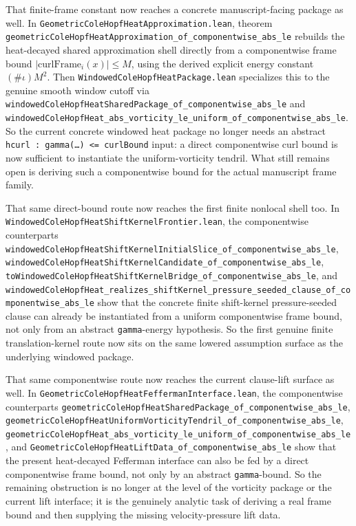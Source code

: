 \documentclass[11pt]{article}
\theoremstyle{remark}
\begin{document}
That finite-frame constant now reaches a concrete manuscript-facing package as
well.  In \texttt{GeometricColeHopfHeatApproximation.lean}, theorem
\texttt{geometricColeHopfHeatApproximation\_of\_componentwise\_abs\_le}
rebuilds the heat-decayed shared approximation shell directly from a
componentwise frame bound \(|\mathrm{curlFrame}_i(x)| \le M\), using the
derived explicit energy constant \((\#\iota) M^2\).  Then
\texttt{WindowedColeHopfHeatPackage.lean} specializes this to the genuine
smooth window cutoff via
\texttt{windowedColeHopfHeatSharedPackage\_of\_componentwise\_abs\_le} and
\texttt{windowedColeHopfHeat\_abs\_vorticity\_le\_uniform\_of\_componentwise\_abs\_le}.
So the current concrete windowed heat package no longer needs an abstract
\texttt{hcurl : gamma(\ldots) <= curlBound} input: a direct componentwise curl
bound is now sufficient to instantiate the uniform-vorticity tendril.  What
still remains open is deriving such a componentwise bound for the actual
manuscript frame family.

That same direct-bound route now reaches the first finite nonlocal shell too.
In \texttt{WindowedColeHopfHeatShiftKernelFrontier.lean}, the componentwise
counterparts
\texttt{windowedColeHopfHeatShiftKernelInitialSlice\_of\_componentwise\_abs\_le},
\texttt{windowedColeHopfHeatShiftKernelCandidate\_of\_componentwise\_abs\_le},
\texttt{toWindowedColeHopfHeatShiftKernelBridge\_of\_componentwise\_abs\_le},
and
\texttt{windowedColeHopfHeat\_realizes\_shiftKernel\_pressure\_seeded\_clause\_of\_componentwise\_abs\_le}
show that the concrete finite shift-kernel pressure-seeded clause can already
be instantiated from a uniform componentwise frame bound, not only from an
abstract \texttt{gamma}-energy hypothesis.  So the first genuine finite
translation-kernel route now sits on the same lowered assumption surface as the
underlying windowed package.

That same componentwise route now reaches the current clause-lift surface as
well.  In \texttt{GeometricColeHopfHeatFeffermanInterface.lean}, the
componentwise counterparts
\texttt{geometricColeHopfHeatSharedPackage\_of\_componentwise\_abs\_le},
\texttt{geometricColeHopfHeatUniformVorticityTendril\_of\_componentwise\_abs\_le},
\texttt{geometricColeHopfHeat\_abs\_vorticity\_le\_uniform\_of\_componentwise\_abs\_le},
and
\texttt{GeometricColeHopfHeatLiftData\_of\_componentwise\_abs\_le}
show that the present heat-decayed Fefferman interface can also be fed by a
direct componentwise frame bound, not only by an abstract \texttt{gamma}-bound.
So the remaining obstruction is no longer at the level of the vorticity
package or the current lift interface; it is the genuinely analytic task of
deriving a real frame bound and then supplying the missing velocity-pressure
lift data.
\end{document}
